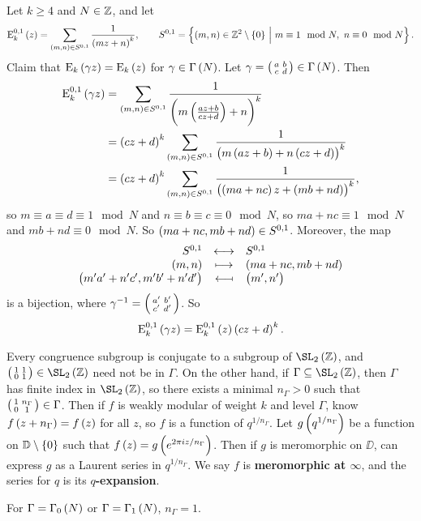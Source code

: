 \begin{example*}
Let $ k \ge 4 $ and $ N \in \mathbb{Z} $, and let
$$ \E_k^{0, 1}\br{z} = \sum_{\br{m, n} \in S^{0, 1}} \dfrac{1}{\br{mz + n}^k}, \qquad S^{0, 1} = \cbr{\br{m, n} \in \ZZ^2 \setminus \cbr{0} \st m \equiv 1 \mod N, \ n \equiv 0 \mod N}. $$
Claim that $ \E_k\br{\gamma z} = \E_k\br{z} $ for $ \gamma \in \Gamma\br{N} $. Let $ \gamma = \twobytwosmall{a}{b}{c}{d} \in \Gamma\br{N} $. Then
\begin{align*}
\E_k^{0, 1}\br{\gamma z}
& = \sum_{\br{m, n} \in S^{0, 1}} \dfrac{1}{\br{m\br{\tfrac{az + b}{cz + d}} + n}^k} \\
& = \br{cz + d}^k\sum_{\br{m, n} \in S^{0, 1}} \dfrac{1}{\br{m\br{az + b} + n\br{cz + d}}^k} \\
& = \br{cz + d}^k\sum_{\br{m, n} \in S^{0, 1}} \dfrac{1}{\br{\br{ma + nc}z + \br{mb + nd}}^k},
\end{align*}
so $ m \equiv a \equiv d \equiv 1 \mod N $ and $ n \equiv b \equiv c \equiv 0 \mod N $, so $ ma + nc \equiv 1 \mod N $ and $ mb + nd \equiv 0 \mod N $. So $ \br{ma + nc, mb + nd} \in S^{0, 1} $. Moreover, the map
$$ \bijection{S^{0, 1}}{S^{0, 1}}{\br{m, n}}{\br{ma + nc, mb + nd}}{\br{m'a' + n'c', m'b' + n'd'}}{\br{m', n'}} $$
is a bijection, where $ \gamma^{-1} = \begin{psmallmatrix} a' & b' \\ c' & d' \end{psmallmatrix} $. So
$$ \E_k^{0, 1}\br{\gamma z} = \E_k^{0, 1}\br{z}\br{cz + d}^k. $$
\end{example*}


Every congruence subgroup is conjugate to a subgroup of $ \SL_2\br{\ZZ} $, and $ \twobytwosmall{1}{1}{0}{1} \in \SL_2\br{\ZZ} $ need not be in $ \Gamma $. On the other hand, if $ \Gamma \subseteq \SL_2\br{\ZZ} $, then $ \Gamma $ has finite index in $ \SL_2\br{\ZZ} $, so there exists a minimal $ n_\Gamma > 0 $ such that $ \begin{psmallmatrix} 1 & n_\Gamma \\ 0 & 1 \end{psmallmatrix} \in \Gamma $. Then if $ f $ is weakly modular of weight $ k $ and level $ \Gamma $, know $ f\br{z + n_\Gamma} = f\br{z} $ for all $ z $, so $ f $ is a function of $ q^{1 / n_\Gamma} $. Let $ g\br{q^{1 / n_\Gamma}} $ be a function on $ \DD \setminus \cbr{0} $ such that $ f\br{z} = g\br{e^{2\pi iz / n_\Gamma}} $. Then if $ g $ is meromorphic on $ \DD $, can express $ g $ as a Laurent series in $ q^{1 / n_\Gamma} $. We say $ f $ is \textbf{meromorphic at $ \infty $}, and the series for $ q $ is its \textbf{$ q $-expansion}.

\begin{example*}
For $ \Gamma = \Gamma_0\br{N} $ or $ \Gamma = \Gamma_1\br{N} $, $ n_\Gamma = 1 $.
\end{example*}

